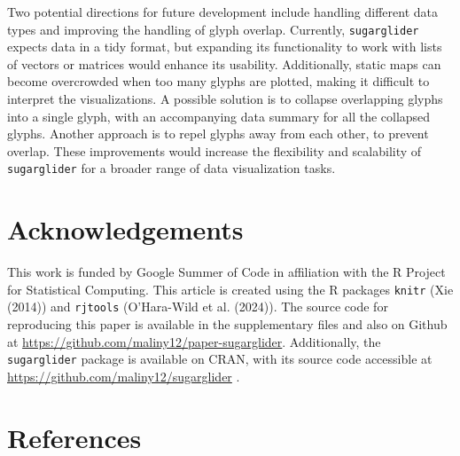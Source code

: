 Two potential directions for future development include handling different data types and improving the handling of glyph overlap. Currently, \texttt{sugarglider} expects data in a tidy format, but expanding its functionality to work with lists of vectors or matrices would enhance its usability. Additionally, static maps can become overcrowded when too many glyphs are plotted, making it difficult to interpret the visualizations. A possible solution is to collapse overlapping glyphs into a single glyph, with an accompanying data summary for all the collapsed glyphs. Another approach is to repel glyphs away from each other, to prevent overlap. These improvements would increase the flexibility and scalability of \texttt{sugarglider} for a broader range of data visualization tasks.

\hypertarget{acknowledgements}{%
\section{Acknowledgements}\label{acknowledgements}}

This work is funded by Google Summer of Code in affiliation with the R Project for Statistical Computing. This article is created using the R packages \texttt{knitr} (Xie (2014)) and \texttt{rjtools} (O'Hara-Wild et al. (2024)). The source code for reproducing this paper is available in the supplementary files and also on Github at \url{https://github.com/maliny12/paper-sugarglider}. Additionally, the \texttt{sugarglider} package is available on CRAN, with its source code accessible at \url{https://github.com/maliny12/sugarglider} .

\hypertarget{references}{%
\section*{References}\label{references}}

